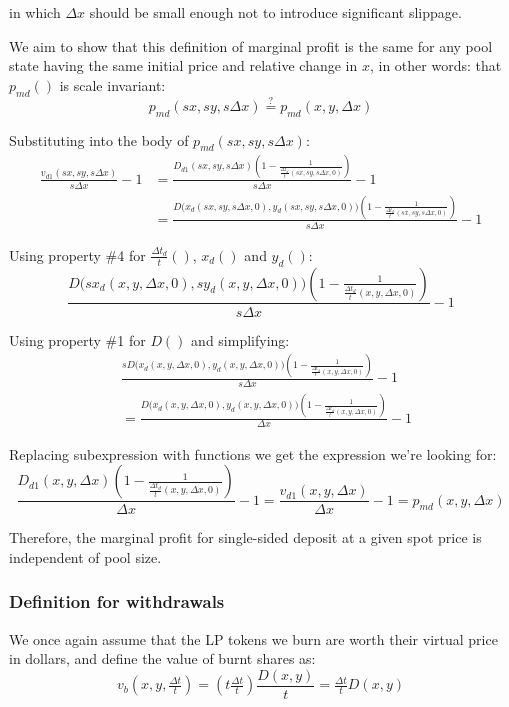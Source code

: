 \documentclass{article}
\begin{document}
in which $\Delta{x}$ should be small enough not to introduce significant slippage.

We aim to show that this definition of marginal profit is the same for any pool state having the same initial price and relative change in $x$, in other words: that $p_{md}()$ is scale invariant:
\[
p_{md}(sx, sy, s\Delta{x}) \stackrel{?}{=} p_{md}(x, y, \Delta{x})
\]

Substituting into the body of $p_{md}(sx, sy, s\Delta{x})$:
\[
\begin{split}
  \frac{v_{d1}(sx, sy, s\Delta{x})}{s\Delta{x}} - 1 &= \frac{D_{d1}(sx, sy, s\Delta{x}) \left(1 - \frac{1}{\tfrac{\Delta{t}_d}{t}(sx, sy, s\Delta{x}, 0)}\right)}{s\Delta{x}} - 1 \\
  &= \frac{D\bigl(x_d(sx, sy, s\Delta{x}, 0), y_d(sx, sy, s\Delta{x}, 0)\bigr) \left(1 - \frac{1}{\tfrac{\Delta{t}_d}{t}(sx, sy, s\Delta{x}, 0)}\right)}{s\Delta{x}} - 1
\end{split}
\]

Using property \#4 for $\tfrac{\Delta{t}_d}{t}()$, $x_d()$ and $y_d()$:
\[
\frac{D\bigl(sx_d(x, y, \Delta{x}, 0), sy_d(x, y, \Delta{x}, 0)\bigr) \left(1 - \frac{1}{\tfrac{\Delta{t}_d}{t}(x, y, \Delta{x}, 0)}\right)}{s\Delta{x}} - 1
\]

Using property \#1 for $D()$ and simplifying:
\[
\begin{split}
  &\frac{sD\bigl(x_d(x, y, \Delta{x}, 0), y_d(x, y, \Delta{x}, 0)\bigr) \left(1 - \frac{1}{\tfrac{\Delta{t}_d}{t}(x, y, \Delta{x}, 0)}\right)}{s\Delta{x}} - 1 \\
  &= \frac{D\bigl(x_d(x, y, \Delta{x}, 0), y_d(x, y, \Delta{x}, 0)\bigr) \left(1 - \frac{1}{\tfrac{\Delta{t}_d}{t}(x, y, \Delta{x}, 0)}\right)}{\Delta{x}} - 1
\end{split}
\]

Replacing subexpression with functions we get the expression we're looking for:
\[
\frac{D_{d1}(x, y, \Delta{x}) \left(1 - \frac{1}{\tfrac{\Delta{t}_d}{t}(x, y, \Delta{x}, 0)}\right)}{\Delta{x}} - 1 = \frac{v_{d1}(x, y, \Delta{x})}{\Delta{x}} - 1 = p_{md}(x, y, \Delta{x})
\]

Therefore, the marginal profit for single-sided deposit at a given spot price is independent of pool size.

\subsubsection{Definition for withdrawals}

We once again assume that the LP tokens we burn are worth their virtual price in dollars, and define the value of burnt shares as:
\[
v_b(x, y, \tfrac{\Delta{t}}{t}) = \left(t \tfrac{\Delta{t}}{t}\right) \frac{D(x, y)}{t} = \tfrac{\Delta{t}}{t} D(x, y)
\]
\end{document}
